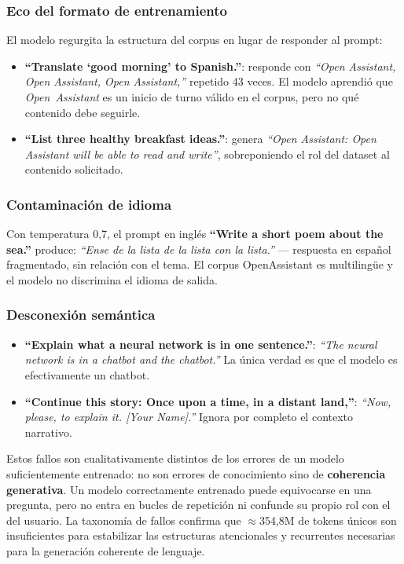 \subsubsection*{Eco del formato de entrenamiento}

El modelo regurgita la estructura del corpus en lugar de responder al prompt:

\begin{itemize}
    \item \textbf{``Translate `good morning' to Spanish.''}: responde con \textit{``Open Assistant, Open Assistant, Open Assistant,''} repetido 43 veces. El modelo aprendió que \textit{Open~Assistant} es un inicio de turno válido en el corpus, pero no qué contenido debe seguirle.
    \item \textbf{``List three healthy breakfast ideas.''}: genera \textit{``Open Assistant: Open Assistant will be able to read and write''}, sobreponiendo el rol del dataset al contenido solicitado.
\end{itemize}

\subsubsection*{Contaminación de idioma}

Con temperatura 0,7, el prompt en inglés \textbf{``Write a short poem about the sea.''} produce: \textit{``Ense de la lista de la lista con la lista.''} --- respuesta en español fragmentado, sin relación con el tema. El corpus OpenAssistant es multilingüe y el modelo no discrimina el idioma de salida.

\subsubsection*{Desconexión semántica}

\begin{itemize}
    \item \textbf{``Explain what a neural network is in one sentence.''}: \textit{``The neural network is in a chatbot and the chatbot.''} La única verdad es que el modelo es efectivamente un chatbot.
    \item \textbf{``Continue this story: Once upon a time, in a distant land,''}: \textit{``Now, please, to explain it. [Your Name].''} Ignora por completo el contexto narrativo.
\end{itemize}

Estos fallos son cualitativamente distintos de los errores de un modelo suficientemente entrenado: no son errores de conocimiento sino de \textbf{coherencia generativa}. Un modelo correctamente entrenado puede equivocarse en una pregunta, pero no entra en bucles de repetición ni confunde su propio rol con el del usuario. La taxonomía de fallos confirma que $\approx$354,8M de tokens únicos son insuficientes para estabilizar las estructuras atencionales y recurrentes necesarias para la generación coherente de lenguaje.

